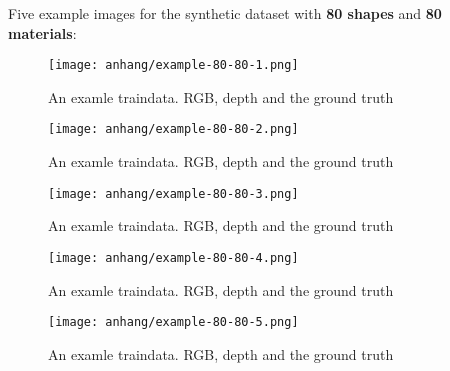 	\FloatBarrier
	\clearpage
	Five example images for the synthetic dataset with \textbf{80 shapes} and \textbf{80 materials}:
	\begin{figure}[H]
		\centering
		\texttt{[image: anhang/example-80-80-1.png]}
		\caption[An examle traindata. RGB, depth and the ground truth]{An examle traindata. RGB, depth and the ground truth}
	\end{figure}
	\begin{figure}[H]
		\centering
		\texttt{[image: anhang/example-80-80-2.png]}
		\caption[An examle traindata. RGB, depth and the ground truth]{An examle traindata. RGB, depth and the ground truth}
	\end{figure}
	\begin{figure}[H]
		\centering
		\texttt{[image: anhang/example-80-80-3.png]}
		\caption[An examle traindata. RGB, depth and the ground truth]{An examle traindata. RGB, depth and the ground truth}
	\end{figure}
	\begin{figure}[H]
		\centering
		\texttt{[image: anhang/example-80-80-4.png]}
		\caption[An examle traindata. RGB, depth and the ground truth]{An examle traindata. RGB, depth and the ground truth}
	\end{figure}
	\begin{figure}[H]
		\centering
		\texttt{[image: anhang/example-80-80-5.png]}
		\caption[An examle traindata. RGB, depth and the ground truth]{An examle traindata. RGB, depth and the ground truth}
	\end{figure}
	
